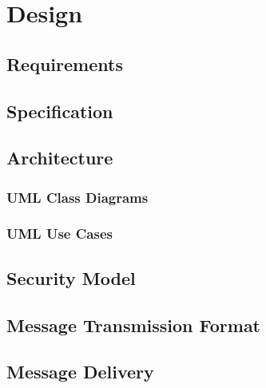 \chapter{Design}

\section{Requirements}



\section{Specification}



\section{Architecture}



\subsection{UML Class Diagrams}





\cleardoublepage

\subsection{UML Use Cases}



\section{Security Model}



\section{Message Transmission Format}



\section{Message Delivery}


